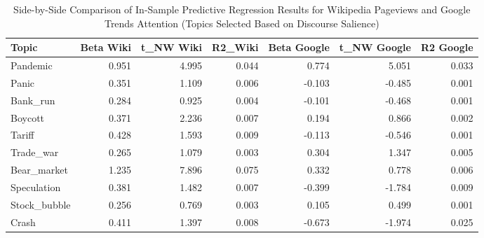 \begin{table}[ht]
\centering
\begin{tabular}{lrrrrrr}
  \hline
Topic & Beta Wiki & t\_NW Wiki & R2\_Wiki & Beta Google & t\_NW Google & R2 Google \\ 
  \hline
Pandemic & 0.951 & 4.995 & 0.044 & 0.774 & 5.051 & 0.033 \\ 
  Panic & 0.351 & 1.109 & 0.006 & -0.103 & -0.485 & 0.001 \\ 
  Bank\_run & 0.284 & 0.925 & 0.004 & -0.101 & -0.468 & 0.001 \\ 
  Boycott & 0.371 & 2.236 & 0.007 & 0.194 & 0.866 & 0.002 \\ 
  Tariff & 0.428 & 1.593 & 0.009 & -0.113 & -0.546 & 0.001 \\ 
  Trade\_war & 0.265 & 1.079 & 0.003 & 0.304 & 1.347 & 0.005 \\ 
  Bear\_market & 1.235 & 7.896 & 0.075 & 0.332 & 0.778 & 0.006 \\ 
  Speculation & 0.381 & 1.482 & 0.007 & -0.399 & -1.784 & 0.009 \\ 
  Stock\_bubble & 0.256 & 0.769 & 0.003 & 0.105 & 0.499 & 0.001 \\ 
  Crash & 0.411 & 1.397 & 0.008 & -0.673 & -1.974 & 0.025 \\ 
   \hline
\end{tabular}
\caption{Side-by-Side Comparison of In-Sample Predictive Regression Results for Wikipedia Pageviews and Google Trends Attention (Topics Selected Based on Discourse Salience)} 
\label{tab:table3_comparison}
\end{table}
